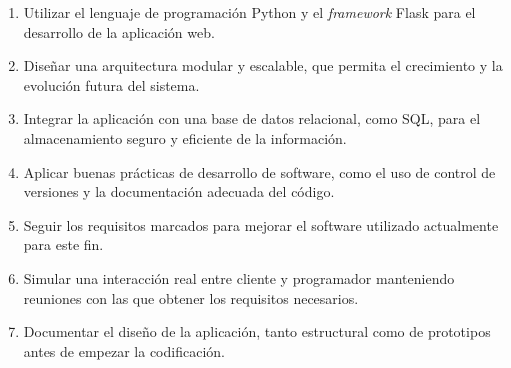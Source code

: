 \begin{enumerate}
  \item Utilizar el lenguaje de programación Python y el \textit{framework} Flask para el desarrollo de la aplicación web.
  \item Diseñar una arquitectura modular y escalable, que permita el crecimiento y la evolución futura del sistema.
  \item Integrar la aplicación con una base de datos relacional, como SQL, para el almacenamiento seguro y eficiente de la información.
  \item Aplicar buenas prácticas de desarrollo de software, como el uso de control de versiones y la documentación adecuada del código.
  \item Seguir los requisitos marcados para mejorar el software utilizado actualmente para este fin.
  \item Simular una interacción real entre cliente y programador manteniendo reuniones con las que obtener los requisitos necesarios.
  \item Documentar el diseño de la aplicación, tanto estructural como de prototipos antes de empezar la codificación.
\end{enumerate}